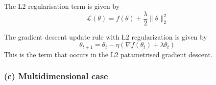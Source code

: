 The L2 regularisation term is given by
\begin{equation*}
      \mathcal{L}(\theta) = f(\theta) + \frac{\lambda}{2} \| \theta \|_2^2
\end{equation*}

The gradient descent update rule with L2 regularization is given by
\begin{equation*}
      \theta_{t+1} = \theta_t - \eta \left( \nabla f(\theta_t) + \lambda \theta_t \right)
\end{equation*}
This is the term that occurs in the L2 patametrised gradient descent.

\subsubsection*{(c) Multidimensional case}
